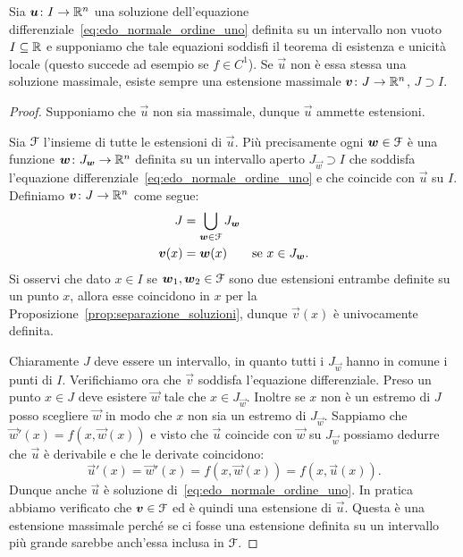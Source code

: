 \begin{theorem}
\label{th:edo_esistenza_massimali}
Sia $\boldsymbol u\colon I\to {\mathbb R}^n$ una soluzione dell'equazione differenziale~\eqref{eq:edo_normale_ordine_uno}
definita su un intervallo non vuoto $I\subseteq {\mathbb R}$
e supponiamo che tale equazioni soddisfi il teorema di esistenza e unicità locale 
(questo succede ad esempio se $f\in C^1$).
Se $\vec u$ non è essa stessa una soluzione massimale, esiste
sempre una estensione massimale $\boldsymbol v\colon J\to {\mathbb R}^n$, $J\supset I$.
\end{theorem}
%
\begin{proof}
Supponiamo che $\vec u$ non sia massimale, dunque $\vec u$ ammette estensioni. 

Sia $\mathcal F$ l'insieme di tutte le estensioni di $\vec u$.
Più precisamente ogni $\boldsymbol w\in \mathcal F$ è una funzione 
$\boldsymbol w\colon J_{\boldsymbol w}\to {\mathbb R}^n$ 
definita su un intervallo aperto $J_{\vec w}\supset I$ 
che soddisfa l'equazione differenziale~\eqref{eq:edo_normale_ordine_uno} 
e che coincide con $\vec u$ su $I$. 
Definiamo $\boldsymbol v\colon J\to{\mathbb R}^n$ come segue:
\begin{align*}
J &= \bigcup_{\boldsymbol w \in \mathcal F} J_{\boldsymbol w}\\
\boldsymbol v(x) &= \boldsymbol w(x) \qquad\text{se $x\in J_{\boldsymbol w}$}.
\end{align*}
Si osservi che dato $x\in I$ se $\boldsymbol w_1, \boldsymbol w_2\in\mathcal F$ 
sono due estensioni entrambe definite su un punto $x$, 
allora esse coincidono in $x$ per la 
Proposizione~\ref{prop:separazione_soluzioni}, 
dunque $\vec v(x)$ è univocamente definita.

Chiaramente $J$ deve essere un intervallo, 
in quanto tutti i $J_{\vec w}$ hanno in comune i punti di $I$.
Verifichiamo ora che $\vec v$ soddisfa l'equazione differenziale. 
Preso un punto $x\in J$ deve esistere $\vec w$ tale che $x\in J_{\vec w}$. 
Inoltre se $x$ non è un estremo di $J$ posso scegliere $\vec w$ in modo 
che $x$ non sia un estremo di $J_{\vec w}$.
Sappiamo che $\vec w'(x) = f(x,\vec w(x))$ e visto che $\vec u$ coincide 
con $\vec w$ su $J_{\vec w}$ possiamo dedurre che 
$\vec u$ è derivabile e che le derivate coincidono:
\[
\vec u'(x) = \vec w'(x) = f(x,\vec w(x)) = f(x,\vec u(x)).
\]
Dunque anche $\vec u$ è soluzione di~\eqref{eq:edo_normale_ordine_uno}.
In pratica abbiamo verificato che $\boldsymbol v\in \mathcal F$ ed è quindi una estensione di $\vec u$. 
Questa è una estensione massimale perché se ci fosse una estensione definita su un intervallo 
più grande 
sarebbe anch'essa inclusa in $\mathcal F$.
\end{proof}

